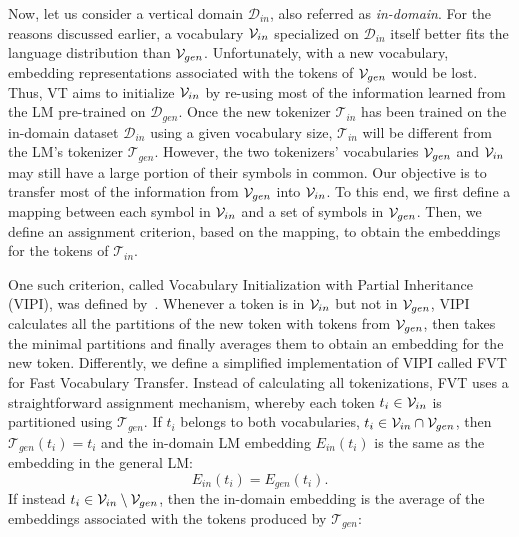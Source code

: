 \documentclass[11pt]{article}
\def\tokgen{\mathcal{T}_{gen}}
\def\domgen{\mathcal{D}_{gen}}
\def\tokin{\mathcal{T}_{in}}
\def\domin{\mathcal{D}_{in}}
\begin{document}
 
Now, let us consider a vertical domain $\domin$, also referred as \textit{in-domain}. For the reasons discussed earlier, a vocabulary ${\cal V}_{in}$ specialized on $\domin$ itself better fits the language distribution than ${\cal V}_{gen}$. Unfortunately, with a new vocabulary, embedding representations associated with the tokens of  ${\cal V}_{gen}$ would be lost. Thus, VT aims to initialize ${\cal V}_{in}$ by re-using most of the information learned from the LM pre-trained on $\domgen$.
 Once the new tokenizer $\tokin$ has been trained on the in-domain dataset $\domin$ using a given vocabulary size,
$\tokin$ will be different from the LM's tokenizer $\tokgen$. However, the two tokenizers' vocabularies ${\cal V}_{gen}$ and ${\cal V}_{in}$ may still have a large portion of their symbols in common.
Our objective is to transfer most of the information from ${\cal V}_{gen}$ into ${\cal V}_{in}$. To this end, we first define a mapping between each symbol in ${\cal V}_{in}$ and a set of symbols in ${\cal V}_{gen}$. Then, we define an assignment criterion, based on the mapping, to obtain the embeddings for the tokens of $\tokin$.


One such criterion, called Vocabulary Initialization with Partial Inheritance (VIPI), was defined by~\citet{samenko2021fine}. Whenever a token is in ${\cal V}_{in}$ but not in ${\cal V}_{gen}$, VIPI calculates all the partitions of the new token with tokens from ${\cal V}_{gen}$, then takes the minimal partitions and finally averages them to obtain an embedding for the new token. 
Differently, we define a simplified implementation of VIPI called FVT for Fast Vocabulary Transfer. Instead of calculating all tokenizations, FVT uses a straightforward assignment mechanism, whereby each token $t_i \in {\cal V}_{in}$ is partitioned using $\tokgen$. If $t_i$ belongs to both vocabularies,  $t_i \in {\cal V}_{in} \cap {\cal V}_{gen}$, then $\tokgen{(t_i)}=t_i$ and the in-domain LM embedding $E_{in}(t_i)$ is the same as the embedding in the general LM: 
\begin{equation}
E_{in}(t_i) = E_{gen}(t_i).\label{eq:base_vt}    
\end{equation}
If instead  $t_i \in {\cal V}_{in} \setminus {\cal V}_{gen}$, then the in-domain embedding is the average of the embeddings associated with the tokens produced by $\tokgen$: %
 
\end{document}
